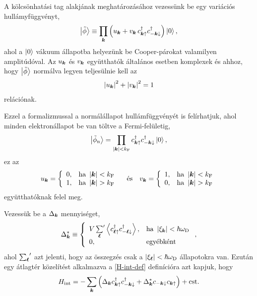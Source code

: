 \documentclass[a4paper,12pt,titlepage]{article}
\newcommand{\KK}{{\vb*{k}}}
\newcommand{\LL}{{\vb*{\ell}}}
\begin{document}
A kölcsönhatási tag alakjának meghatározásához vezessünk be egy variációs hullámyfüggvényt,
\begin{equation} \label{phi-tilde}
	\ket{\tilde{\phi}} \equiv \prod\limits_\KK \left( u_\KK + v_\KK \, c_{\KK \uparrow}^\dagger c_{-\KK \downarrow}^\dagger \right) \ket{0},
\end{equation}
ahol a $\ket{0}$ vákuum állapotba helyezünk be Cooper-párokat valamilyen amplitúdóval.  Az $u_\KK$ és $v_\KK$ együtthatók általános esetben komplexek és ahhoz, hogy $\ket{\tilde{\phi}}$ normálva legyen teljesülnie kell az
\begin{equation} \label{u-v-norm}
	\left| u_\KK \right|^2 + \left| v_\KK \right|^2 = 1
\end{equation}
relációnak.

Ezzel a formalizmussal a normálállapot hullámfüggvényét is felírhatjuk, ahol minden elektronállapot be van töltve a Fermi-felületig,
\begin{equation}
	\ket{\tilde{\phi}_\text{n}} = \prod\limits_{\left| \KK \right| < k_\text{F}} c_{\KK \uparrow}^\dagger c_{-\KK \downarrow}^\dagger \ket{0},
\end{equation}
ez az
\begin{equation}
	u_\KK = \left\{ \begin{array}{ll} 0, & \text{ha } \left| \KK \right| < k_\text{F} \\ 1, & \text{ha } \left| \KK \right| > k_\text{F} \end{array} \right.
	~~~ \text{és} ~~~
	v_\KK = \left\{ \begin{array}{ll} 1, & \text{ha } \left| \KK \right| < k_\text{F} \\ 0, & \text{ha } \left| \KK \right| > k_\text{F} \end{array} \right.
\end{equation}
együtthatóknak felel meg.

Vezessük be a $\Delta_\KK$ mennyiséget,
\begin{equation}
	\Delta_\KK^* \equiv \left\{ \begin{array}{ll}
	V \, {\sum\limits_\LL}^\prime \expval{c_{\LL \uparrow}^\dagger c_{-\LL \downarrow}^\dagger}, & \text{ha } \left| \xi_\KK \right| < \hbar \omega_\text{D} \\
	0, & \text{egyébként}
	\end{array} \right. ,
\end{equation}
ahol ${\sum_\LL}^\prime$ azt jelenti, hogy az összegzés csak a $\left| \xi_\LL \right| < \hbar \omega_\text{D}$ állapotokra van.  Ezután egy átlagtér közelítést alkalmazva a \eqref{H-int-def} definícióra azt kapjuk, hogy
\begin{equation}
	H_\text{int} = - \sum\limits_\KK \left( \Delta_\KK c_{\KK \uparrow}^\dagger c_{-\KK \downarrow}^\dagger + \Delta_\KK^* c_{-\KK \downarrow} c_{\KK \uparrow} \right) + \text{cst}.
\end{equation}
\end{document}

